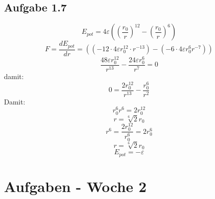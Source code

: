 \documentclass{article}
\begin{document}
\subsection*{Aufgabe 1.7}
\begin{equation*}
    E_{pot} = 4\varepsilon\left(\left(\frac{r_0}{r}\right)^{12} - \left(\frac{r_0}{r}\right)^6\right)
\end{equation*}
\begin{equation*}
    F = \frac{dE_{pot}}{dr}=\left(\left(-12\cdot 4\varepsilon r_0^{12} \cdot r^{-13}\right)-\left(-6\cdot 4\varepsilon r_0^6r^{-7}\right)\right)
\end{equation*}
\begin{equation*}
    \frac{48\varepsilon r_0^{12}}{r^13} - \frac{24\varepsilon r_0^6}{r^7} = 0
\end{equation*}
damit:
\begin{equation*}
    0 = \frac{2 r_0^12}{r^13}-\frac{r_0^6}{r^2}
\end{equation*}
Damit:
\begin{equation*}
    r_0^6r^6 = 2r_0^12
\end{equation*}
\begin{equation*}
    r = \sqrt[6]{2}r_0
\end{equation*}
\begin{equation*}
    r^6=\frac{2r_0^{12}}{r_0^6}=2r_0^6
\end{equation*}
\begin{equation*}
    r=\sqrt[6]{2}r_0
\end{equation*}
\begin{equation*}
    E_{pot}=-\varepsilon
\end{equation*}

\section*{Aufgaben - Woche 2}
\end{document}
